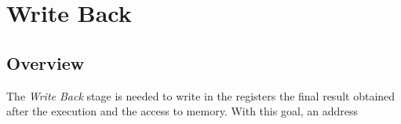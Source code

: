 \chapter{Write Back}
\label{chap_wb}

\section{Overview}

The \textit{Write Back} stage is needed to write in the registers the final result obtained after the execution and the access to memory. With this goal, an address 





